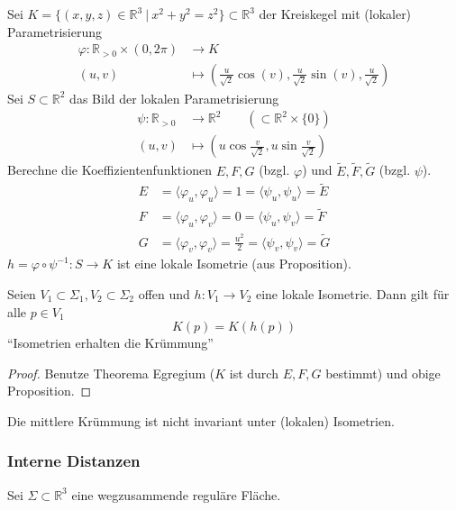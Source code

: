 \documentclass[../main.tex]{subfiles}
\begin{document}
\begin{example}[Kreiskegel]
    Sei $K=\{(x,y,z)\in \mathbb{R}^3 \ | \ x^2 + y^2 = z^2 \} \subset \mathbb{R}^3$ der Kreiskegel
    mit (lokaler) Parametrisierung
    \begin{align*}
        \varphi : \mathbb{R}_{>0} \times (0, 2\pi) &\to K \\
        (u,v) &\mapsto (\frac{u}{\sqrt{2}}\cos(v), \frac{u}{\sqrt{2}}\sin(v), \frac{u}{\sqrt{2}})
    \end{align*}
    Sei $S\subset \mathbb{R}^2$ das Bild der lokalen Parametrisierung
    \begin{align*}
        \psi : \mathbb{R}_{>0} &\to \mathbb{R}^2 \qquad (\subset \mathbb{R}^2 \times \{0\}) \\
        (u,v) &\mapsto (u\cos \frac{v}{\sqrt{2}}, u\sin \frac{v}{\sqrt{2}})
    \end{align*}
    Berechne die Koeffizientenfunktionen $E,F,G$ (bzgl. $\varphi$) und $\tilde{E}, \tilde{F}, \tilde{G}$ (bzgl. $\psi$).
    \begin{align*}
        E &= \langle \varphi _u, \varphi _u \rangle = 1 = \langle \psi _u, \psi _u \rangle = \tilde{E} \\
        F &= \langle \varphi _u, \varphi _v \rangle = 0 = \langle \psi _u, \psi _v \rangle = \tilde{F} \\
        G &= \langle \varphi _v, \varphi _v \rangle = \frac{u^2}{2} = \langle \psi _v, \psi _v \rangle = \tilde{G} 
    \end{align*}
    $h = \varphi \circ \psi ^{-1} : S \to K $ ist eine lokale Isometrie (aus Proposition).
\end{example}

\begin{corollary}
    Seien $V_1 \subset \Sigma_1, V_2 \subset \Sigma _2$ offen und
    $h: V_1 \to V_2$ eine lokale Isometrie. Dann gilt für alle $p\in V_1$
    $$K(p)=K(h(p))$$ ``Isometrien erhalten die Krümmung''
\end{corollary}
\begin{proof}
    Benutze Theorema Egregium ($K$ ist durch $E,F,G$ bestimmt) und obige Proposition.
\end{proof}

\begin{remark}
    Die mittlere Krümmung ist nicht invariant unter (lokalen) Isometrien.
\end{remark}

\subsubsection*{Interne Distanzen}
Sei $\Sigma \subset \mathbb{R}^3$ eine wegzusammende reguläre Fläche.
\end{document}
